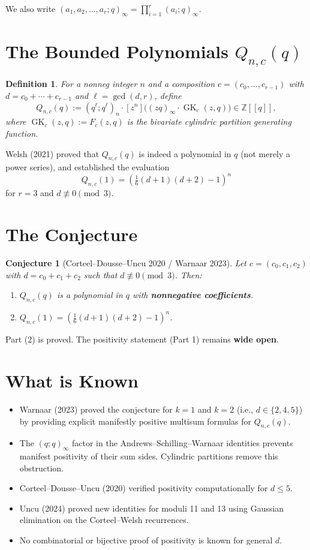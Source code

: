 \documentclass[11pt]{article}
\newtheorem{definition}{Definition}
\newtheorem{conjecture}{Conjecture}
\begin{document}
We also write $(a_1,a_2,\ldots,a_r;q)_\infty = \prod_{i=1}^r (a_i;q)_\infty$.

\section{The Bounded Polynomials $Q_{n,c}(q)$}

\begin{definition}
For a nonneg integer $n$ and a composition $c = (c_0,\ldots,c_{r-1})$ with $d = c_0+\cdots+c_{r-1}$ and $\ell = \gcd(d,r)$, define
\[
Q_{n,c}(q) := (q^\ell;q^\ell)_n \cdot [z^n]\Big((zq)_\infty \cdot \operatorname{GK}_c(z,q)\Big) \in \mathbb{Z}[[q]],
\]
where $\operatorname{GK}_c(z,q) := F_c(z,q)$ is the bivariate cylindric partition generating function.
\end{definition}

Welsh (2021) proved that $Q_{n,c}(q)$ is indeed a polynomial in $q$ (not merely a power series), and established the evaluation
\[
Q_{n,c}(1) = \left(\tfrac{1}{6}(d+1)(d+2) - 1\right)^n
\]
for $r=3$ and $d \not\equiv 0 \pmod{3}$.

\section{The Conjecture}

\begin{conjecture}[Corteel--Dousse--Uncu 2020 / Warnaar 2023]\label{conj:positivity}
Let $c = (c_0,c_1,c_2)$ with $d = c_0+c_1+c_2$ such that $d \not\equiv 0 \pmod{3}$. Then:
\begin{enumerate}
\item $Q_{n,c}(q)$ is a polynomial in $q$ with \textbf{nonnegative coefficients}.
\item $Q_{n,c}(1) = \left(\tfrac{1}{6}(d+1)(d+2)-1\right)^n$.
\end{enumerate}
\end{conjecture}

Part (2) is proved. The positivity statement (Part 1) remains \textbf{wide open}.

\section{What is Known}

\begin{itemize}
\item Warnaar (2023) proved the conjecture for $k=1$ and $k=2$ (i.e., $d \in \{2,4,5\}$) by providing explicit manifestly positive multisum formulas for $Q_{n,c}(q)$.
\item The $(q;q)_\infty$ factor in the Andrews--Schilling--Warnaar identities prevents manifest positivity of their sum sides. Cylindric partitions remove this obstruction.
\item Corteel--Dousse--Uncu (2020) verified positivity computationally for $d \leq 5$.
\item Uncu (2024) proved new identities for moduli 11 and 13 using Gaussian elimination on the Corteel--Welsh recurrences.
\item No combinatorial or bijective proof of positivity is known for general $d$.
\end{itemize}
\end{document}
